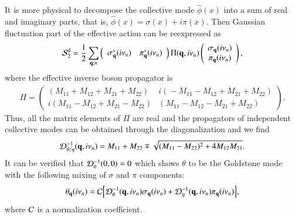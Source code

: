\documentclass[aps,prd,amsmath,two column,nofootinbib,amssymb,referee]{revtex4}
\begin{document}
It is more physical to decompose the collective mode $\hat\phi(x)$ into a sum of real and imaginary parts, that is, $\hat\phi(x)=\sigma(x)+i\pi(x)$. Then  Gaussian fluctuation part of the effective action can be reexpressed as
\begin{eqnarray}
{\cal S}_2^{\rm d}={1\over2}\sum_{{\bf q},n}\left(\begin{array}{cc}\sigma_{\bf q}^*(i\nu_n)&\pi_{\bf q}^*(i\nu_n)\end{array}\right)\Pi({\bf q},i\nu_n)\left(\begin{array}{c}\sigma_{\bf q}(i\nu_n)\\ \pi_{\bf q}(i\nu_n)\end{array}\right),
\end{eqnarray}
where the effective inverse boson propagator is
\begin{eqnarray}
\Pi\!=\!\left(\begin{array}{cc}
\!\!(M_{11}\!+\!M_{12}\!+\!M_{21}\!+\!M_{22})\!&\!\!i(\!-\!M_{11}\!-\!M_{12}\!+\!M_{21}\!+\!M_{22})\!\!\!\\
\!\!i(M_{11}\!-\!M_{12}\!+\!M_{21}\!-\!M_{22})\!&\!\!(M_{11}\!-\!M_{12}\!-\!M_{21}\!+\!M_{22})\!\!\!
\end{array}\right).
\end{eqnarray}
Thus, all the matrix elements of $\Pi$ are real and the propagators
of independent collective modes can be obtained through the
diagonalization and we find
\begin{eqnarray}
{\cal D}_{\theta/\eta}^{-1}({\bf q},i\nu_n)=M_{11}+M_{22}\mp\sqrt{(M_{11}-M_{22})^2+4M_{12}M_{21}}.
\end{eqnarray}
It can be verified that ${\cal D}_{\theta}^{-1}(0,0)=0$ which shows $\theta$ to be the Goldstone mode with the following mixing of $\sigma$ and $\pi$ components:
\begin{eqnarray}
\theta_{\bf q}(i\nu_n)={\cal C}\Big[{\cal D}_{\theta}^{-1}({\bf q},i\nu_n)\sigma_{\bf q}(i\nu_n)+{\cal D}_{\eta}^{-1}({\bf q},i\nu_n)\pi_{\bf q}(i\nu_n)\Big],
\end{eqnarray}
where ${\cal C}$ is a normalization coefficient.
\end{document}
